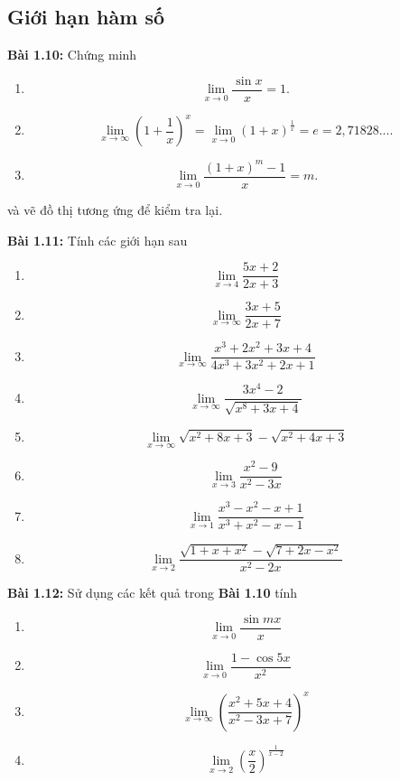 \subsection*{Giới hạn hàm số}
\textbf{Bài 1.10:} Chứng minh
\begin{enumerate}[label=(\alph*)]
    \item \[\lim_{x\rightarrow 0}\frac{\sin x}{x}=1.\]
    \item \[\lim_{x\rightarrow\infty}\left(1+\frac{1}{x}\right)^x =\lim_{x\rightarrow 0}\left(1+x\right)^{\frac{1}{x}}= e=2,71828... .\]
    \item \[\lim_{x\rightarrow 0}\frac{(1+x)^m -1}{x}=m.\]
\end{enumerate}
và vẽ đồ thị tương ứng để kiểm tra lại.
\vspace{5pt}

\textbf{Bài 1.11:} Tính các giới hạn sau 
\begin{enumerate}[label=(\alph*)]
    \item \[\lim_{x\rightarrow 4}\frac{5x+2}{2x+3}\]
    \item \[\lim_{x\rightarrow \infty}\frac{3x+5}{2x+7} \]
    \item \[\lim_{x\rightarrow\infty}\frac{x^3 +2x^2 +3x+4}{4x^3 +3x^2 +2x+1}\]
    \item \[\lim_{x\rightarrow\infty}\frac{3x^4 -2}{\sqrt{x^8+3x+4}}\]
    \item \[\lim_{x\rightarrow\infty}\sqrt{x^2 +8x+3}-\sqrt{x^2+4x+3}\]
    \item \[\lim_{x\rightarrow 3}\frac{x^2 -9}{x^2-3x}\]
    \item \[\lim_{x\rightarrow 1}\frac{x^3 -x^2 -x+1}{x^3+x^2 -x-1}\]
    \item \[\lim_{x\rightarrow 2}\frac{\sqrt{1+x+x^2}-\sqrt{7+2x-x^2}}{x^2-2x}\]
\end{enumerate}
\vspace{5pt}

\textbf{Bài 1.12:} Sử dụng các kết quả trong \textbf{Bài 1.10} tính
\begin{enumerate}[label=(\alph*)]
    \item \[\lim_{x\rightarrow 0}\frac{\sin mx}{x}\]
    \item \[\lim_{x\rightarrow 0}\frac{1-\cos 5x}{x^2}\]
    \item \[\lim_{x\rightarrow\infty}\left(\frac{x^2+5x+4}{x^2-3x+7}\right)^x\]
    \item \[\lim_{x\rightarrow 2}\left(\frac{x}{2}\right)^{\frac{1}{x-2}}\]
\end{enumerate}

